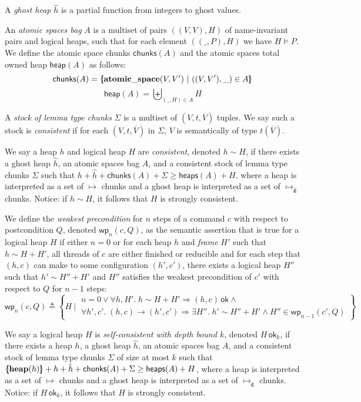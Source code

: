 \documentclass{article}
\newcommand{\gmapsto}{\mapsto_\mathsf{g}}
\newcommand{\llbrace}{\{\hspace{-3pt}[}
\newcommand{\rrbrace}{]\hspace{-3pt}\}}
\begin{document}
A \emph{ghost heap} $\hat{h}$ is a partial function from integers to ghost values.

An \emph{atomic spaces bag} $A$ is a multiset of pairs $((V, V), H)$ of name-invariant pairs and logical heaps, such that for each element $((\_, P), H)$ we have $H \vDash P$. We define the atomic space chunks $\mathsf{chunks}(A)$ and the atomic spaces total owned heap $\mathsf{heap}(A)$ as follows:
$$\mathsf{chunks}(A) = \llbrace \mathbf{atomic\_space}(V, V')\ |\ ((V, V'), \_) \in A\rrbrace$$
$$\mathsf{heap}(A) = \biguplus_{(\_, H) \in A} H$$

A \emph{stock of lemma type chunks} $\Sigma$ is a multiset of $(V, t, \overline{V})$ tuples. We say such a stock is \emph{consistent} if for each $(V, t, \overline{V})$ in $\Sigma$, $V$ is semantically of type $t(\overline{V})$.

We say a heap $h$ and logical heap $H$ are \emph{consistent}, denoted $h \sim H$, if there exists a ghost heap $\hat{h}$, an atomic spaces bag $A$, and a consistent stock of lemma type chunks $\Sigma$ such that $h + \hat{h} + \mathsf{chunks}(A) + \Sigma \ge \mathsf{heaps}(A) + H$, where a heap is interpreted as a set of $\mapsto$ chunks and a ghost heap is interpreted as a set of $\gmapsto$ chunks. Notice: if $h \sim H$, it follows that $H$ is strongly consistent.

We define the \emph{weakest precondition} for $n$ steps of a command $c$ with respect to postcondition $Q$, denoted $\mathsf{wp}_n(c, Q)$, as the semantic assertion that is true for a logical heap $H$ if either $n = 0$ or for each heap $h$ and \emph{frame} $H'$ such that $h \sim H + H'$, all threads of $c$ are either finished or reducible and for each step that $(h, c)$ can make to some configuration $(h', c')$, there exists a logical heap $H''$ such that $h' \sim H'' + H'$ and $H''$ satisfies the weakest precondition of $c'$ with respect to $Q$ for $n - 1$ steps:
$$\mathsf{wp}_n(c, Q) \triangleq \left\{H\ |\ \begin{array}{l}
n = 0 \lor \forall h, H'.\;h \sim H + H' \Rightarrow (h, c)\,\mathsf{ok} \land {}\\
\forall h', c'.\;(h, c) \rightarrow (h', c') \Rightarrow \exists H''.\;h' \sim H'' + H' \land H'' \in \mathsf{wp}_{n - 1}(c', Q)
\end{array}\right\}$$

We say a logical heap $H$ is \emph{self-consistent with depth bound $k$}, denoted $H\,\mathsf{ok}_k$, if there exists a heap $h$, a ghost heap $\hat{h}$, an atomic spaces bag $A$, and a consistent stock of lemma type chunks $\Sigma$ of size at most $k$ such that $\llbrace\mathbf{heap}(h)\rrbrace + h + \hat{h} + \mathsf{chunks}(A) + \Sigma \ge \mathsf{heaps}(A) + H$, where a heap is interpreted as a set of $\mapsto$ chunks and a ghost heap is interpreted as a set of $\gmapsto$ chunks. Notice: if $H\,\mathsf{ok}_k$, it follows that $H$ is strongly consistent.
\end{document}
